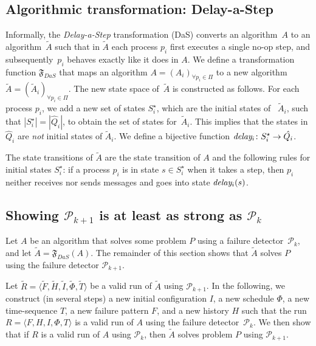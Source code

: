 \documentclass[11pt]{article}
\newcommand{\ident}[1]{\textit{#1}\rule{0cm}{1ex}}
\newcommand{\PFD}{\ensuremath{\mathcal{P}}}
\newcommand{\problem}{P} \newcommand{\Alg}{A}
\newcommand{\TrAlg}{\widetilde{A}}
\begin{document}
\subsection{Algorithmic transformation: Delay-a-Step}
\label{subsubsec:atdas}

Informally, the \emph{Delay-a-Step} transformation (DaS) converts an
     algorithm~$\Alg$ to an algorithm~$\TrAlg$ such that in $\TrAlg$
     each process $p_i$ first executes a single no-op step, and
     subsequently~$p_i$ behaves exactly like it does in $\Alg$.
We define a transformation function $\mathfrak{F}_{DaS}$ that maps an
     algorithm $\Alg = (\Alg_i)_{\forall p_i \in \Pi}$   to a new
     algorithm $\TrAlg = (\TrAlg_i)_{\forall p_i \in \Pi}$.
The new state space of~$\TrAlg$ is constructed as follows.
For each process $p_i$, we add a new set of states $S^\star_i$, which are the initial states of ~$\TrAlg_i$, such
     that $|S^\star_i| = |\hat{Q}_i|$, to obtain the set of states
     for~$\TrAlg_i$.
This implies that the states in $\hat{Q}_i$ are \emph{not} initial
     states of $\TrAlg_i$.
We define a bijective function $\ident{delay}_i\colon S^\star_i
     \rightarrow \hat{Q_i}$.


The state transitions of $\TrAlg$ are the state transition of $\Alg$
     and the following rules for initial states $S^\star_i$: if a
     process $p_i$ is in state $s\in S^\star_i$ when it takes a step,
     then $p_i$ neither receives nor sends messages and goes into
     state $\ident{delay}_i(s)$.




\subsection{Showing $\PFD_{k+1}$ is at least as strong as $\PFD_{k}$}

Let $\Alg$ be an algorithm that solves some problem $\problem$ using a
     failure detector~$\PFD_k$, and let $\TrAlg =
     \mathfrak{F}_{DaS}(A)$.
The remainder of this section  shows that $\TrAlg$ solves $\problem$
     using the failure detector $\PFD_{k+1}$.

Let $\widetilde{R}=\langle \widetilde{F}, \widetilde{H},
     \widetilde{I}, \widetilde{\Phi}, \widetilde{T} \rangle$ be a
     valid run of $\TrAlg$ using $\PFD_{k+1}$.
In the following, we construct (in several steps)  a new initial
     configuration $I$, a new schedule $\Phi$, a new time-sequence
     $T$, a new failure pattern $F$, and a new history $H$ such that
     the run $R = \langle F,H,I,\Phi,T \rangle$ is a valid run of
     $\Alg$ using the failure detector~$\PFD_k$.
We then show that if $R$ is a valid run of $\Alg$ using $\PFD_k$, then
     $\TrAlg$ solves problem $\problem$ using $\PFD_{k+1}$.
\end{document}
